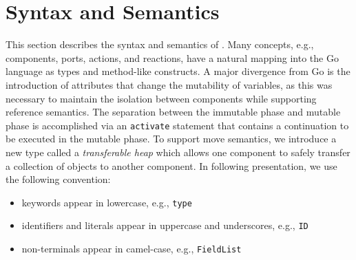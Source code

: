 
\section{Syntax and Semantics}

This section describes the syntax and semantics of \rcgo{}.
Many concepts, e.g., components, ports, actions, and reactions, have a natural mapping into the Go language as types and method-like constructs.
A major divergence from Go is the introduction of attributes that change the mutability of variables, as this was necessary to maintain the isolation between components while supporting reference semantics.
The separation between the immutable phase and mutable phase is accomplished via an \verb+activate+ statement that contains a continuation to be executed in the mutable phase.
To support move semantics, we introduce a new type called a \emph{transferable heap} which allows one component to safely transfer a collection of objects to another component.
In following presentation, we use the following convention:
\begin{itemize}
  \item keywords appear in lowercase, e.g., \verb+type+
  \item identifiers and literals appear in uppercase and underscores, e.g., \verb+ID+
  \item non-terminals appear in camel-case, e.g., \verb+FieldList+
\end{itemize}

